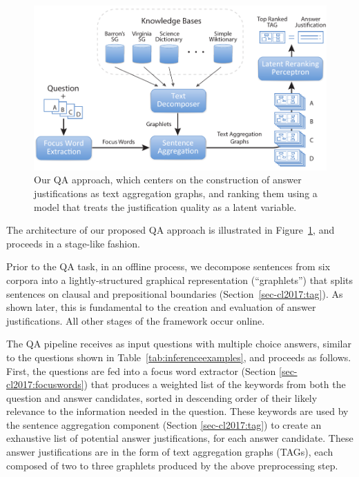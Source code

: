 \begin{figure}[t!]
\centering

\includegraphics[width=1.0\textwidth]{mainmatter/tacl2015-tig/tag_architecture6c.pdf}

\caption{Our QA approach, which centers on the construction of answer justifications as text aggregation graphs, and ranking them using a model that treats the justification quality as a latent variable.}
\label{fig:architecture}
\end{figure}

The architecture of our proposed QA approach is illustrated in Figure~\ref{fig:architecture}, and proceeds in a stage-like fashion.  

Prior to the QA task, in an offline process, we decompose sentences from six corpora into a lightly-structured graphical representation (``graphlets'') that splits sentences on clausal and prepositional boundaries (Section~\ref{sec-cl2017:tag}). As shown later, this is fundamental to the creation and evaluation of answer justifications.  All other stages of the framework occur online. 

The QA pipeline receives as input questions with multiple choice answers, similar to the questions shown in Table~\ref{tab:inferenceexamples}, and proceeds as follows. First, the questions are fed into a focus word extractor (Section \ref{sec-cl2017:focuswords}) that produces a weighted list of the keywords from both the question and answer candidates, sorted in descending order of their likely relevance to the information needed in the question. These keywords are used by the sentence aggregation component (Section \ref{sec-cl2017:tag}) to create an exhaustive list of potential answer justifications, for each answer candidate.  These answer justifications are in the form of text aggregation graphs (TAGs), each composed of two to three graphlets produced by the above preprocessing step.

